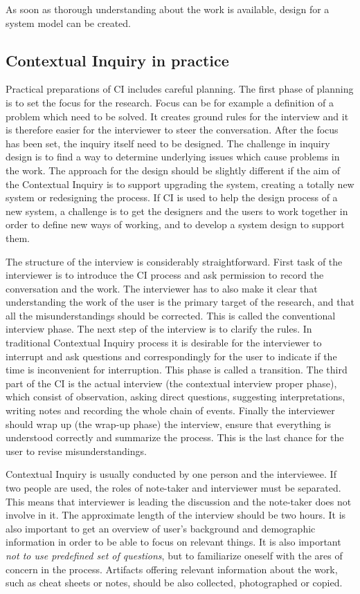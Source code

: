 \documentclass[12pt,a4paper,oneside,pdftex]{report}
\begin{document}
As soon as thorough understanding about the work is available, design for a system model can be created.\cite{RefWorks:14} 

\subsection{Contextual Inquiry in practice}

Practical preparations of CI includes careful planning. The first phase of planning is to set the focus for the research. Focus can be for example a definition of a problem which need to be solved. It creates ground rules for the interview and it is therefore easier for the interviewer to steer the conversation. After the focus has been set, the inquiry itself need to be designed. The challenge in inquiry design is to find a way to determine underlying issues which cause problems in the work. The approach for the design should be slightly different if the aim of the Contextual Inquiry is to support upgrading the system, creating a totally new system or redesigning the process. If CI is used to help the design process of a new system, a challenge is to get the designers and the users to work together in order to define new ways of working, and to develop a system design to support them. \cite{RefWorks:21} 

The structure of the interview is considerably straightforward. First task of the interviewer is to introduce the CI process and ask permission to record the conversation and the work. The interviewer has to also make it clear that understanding the work of the user is the primary target of the research, and that all the misunderstandings should be corrected. This is called the conventional interview phase. The next step of the interview is to clarify the rules. In traditional Contextual Inquiry process it is desirable for the interviewer to interrupt and ask questions and correspondingly for the user to indicate if the time is inconvenient for interruption. This phase is called a transition. The third part of the CI is the actual interview (the contextual interview proper phase), which consist of observation, asking direct questions, suggesting interpretations, writing notes and recording the whole chain of events. Finally the interviewer should wrap up (the wrap-up phase) the interview, ensure that everything is understood correctly and summarize the process. This is the last chance for the user to revise misunderstandings. \cite{RefWorks:21}

Contextual Inquiry is usually conducted by one person and the interviewee. If two people are used, the roles of note-taker and interviewer must be separated. This means that interviewer is leading the discussion and the note-taker does not involve in it. The approximate length of the interview should be two hours. It is also important to get an overview of user's background and demographic information in order to be able to focus on relevant things. It is also important \emph{not to use predefined set of questions}, but to familiarize oneself  with the ares of concern in the process. Artifacts offering relevant information about the work, such as cheat sheets or notes, should be also collected, photographed or copied. \cite{RefWorks:27}
\end{document}
